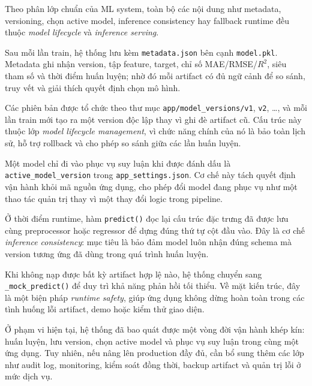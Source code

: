Theo phân lớp chuẩn của ML system, toàn bộ các nội dung như metadata, versioning, chọn active model, inference consistency hay fallback runtime đều thuộc \textit{model lifecycle} và \textit{inference serving}.


Sau mỗi lần train, hệ thống lưu kèm \texttt{metadata.json} bên cạnh \texttt{model.pkl}. Metadata ghi nhận version, tập feature, target, chỉ số MAE/RMSE/$R^2$, siêu tham số và thời điểm huấn luyện; nhờ đó mỗi artifact có đủ ngữ cảnh để so sánh, truy vết và giải thích quyết định chọn mô hình.


Các phiên bản được tổ chức theo thư mục \texttt{app/model\_versions/v1}, \texttt{v2}, \ldots, và mỗi lần train mới tạo ra một version độc lập thay vì ghi đè artifact cũ. Cấu trúc này thuộc lớp \textit{model lifecycle management}, vì chức năng chính của nó là bảo toàn lịch sử, hỗ trợ rollback và cho phép so sánh giữa các lần huấn luyện.


Một model chỉ đi vào phục vụ suy luận khi được đánh dấu là \texttt{active\_model\_version} trong \texttt{app\_settings.json}. Cơ chế này tách quyết định vận hành khỏi mã nguồn ứng dụng, cho phép đổi model đang phục vụ như một thao tác quản trị thay vì một thay đổi logic trong pipeline.


Ở thời điểm runtime, hàm \texttt{predict()} đọc lại cấu trúc đặc trưng đã được lưu cùng preprocessor hoặc regressor để dựng đúng thứ tự cột đầu vào. Đây là cơ chế \textit{inference consistency}: mục tiêu là bảo đảm model luôn nhận đúng schema mà version tương ứng đã dùng trong quá trình huấn luyện.


Khi không nạp được bất kỳ artifact hợp lệ nào, hệ thống chuyển sang \texttt{\_mock\_predict()} để duy trì khả năng phản hồi tối thiểu. Về mặt kiến trúc, đây là một biện pháp \textit{runtime safety}, giúp ứng dụng không dừng hoàn toàn trong các tình huống lỗi artifact, demo hoặc kiểm thử giao diện.


Ở phạm vi hiện tại, hệ thống đã bao quát được một vòng đời vận hành khép kín: huấn luyện, lưu version, chọn active model và phục vụ suy luận trong cùng một ứng dụng. Tuy nhiên, nếu nâng lên production đầy đủ, cần bổ sung thêm các lớp như audit log, monitoring, kiểm soát đồng thời, backup artifact và quản trị lỗi ở mức dịch vụ.

